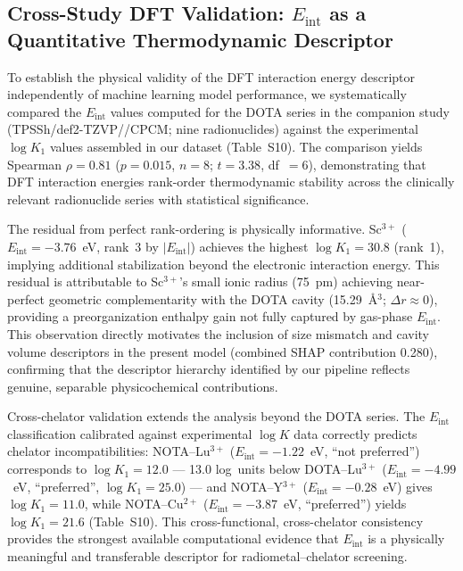 \documentclass[journal=jacsat,manuscript=article]{achemso}
\begin{document}
\subsection{Cross-Study DFT Validation: $E_\mathrm{int}$ as a Quantitative Thermodynamic Descriptor}
\label{sec:dft_val}

To establish the physical validity of the DFT interaction energy descriptor
independently of machine learning model performance, we systematically compared
the $E_\mathrm{int}$ values computed for the DOTA series in the companion
study\cite{Kim2026molpharm} (TPSSh/def2-TZVP//CPCM; nine radionuclides)
against the experimental $\log K_1$ values assembled in our dataset (Table~S10).
The comparison yields Spearman $\rho = 0.81$ ($p = 0.015$, $n = 8$;
$t = 3.38$, df~$= 6$), demonstrating that DFT interaction energies
rank-order thermodynamic stability across the clinically relevant radionuclide
series with statistical significance.

The residual from perfect rank-ordering is physically informative.
Sc$^{3+}$ ($E_\mathrm{int} = -3.76$~eV, rank~3 by $|E_\mathrm{int}|$)
achieves the highest $\log K_1 = 30.8$ (rank~1), implying additional
stabilization beyond the electronic interaction energy.
This residual is attributable to Sc$^{3+}$'s small ionic radius (75~pm)
achieving near-perfect geometric complementarity with the DOTA cavity
(15.29~\AA$^3$; $\Delta r \approx 0$), providing a preorganization enthalpy
gain not fully captured by gas-phase $E_\mathrm{int}$.\cite{Kim2026molpharm,Shannon1976}
This observation directly motivates the inclusion of size mismatch and cavity
volume descriptors in the present model (combined SHAP contribution 0.280),
confirming that the descriptor hierarchy identified by our pipeline reflects
genuine, separable physicochemical contributions.

Cross-chelator validation extends the analysis beyond the DOTA series.
The $E_\mathrm{int}$ classification\cite{Kim2026molpharm} calibrated against
experimental $\log K$ data correctly predicts chelator incompatibilities:
NOTA--Lu$^{3+}$ ($E_\mathrm{int} = -1.22$~eV, ``not preferred'') corresponds
to $\log K_1 = 12.0$ --- 13.0 log~units below DOTA--Lu$^{3+}$
($E_\mathrm{int} = -4.99$~eV, ``preferred'', $\log K_1 = 25.0$) ---
and NOTA--Y$^{3+}$ ($E_\mathrm{int} = -0.28$~eV) gives $\log K_1 = 11.0$,
while NOTA--Cu$^{2+}$ ($E_\mathrm{int} = -3.87$~eV, ``preferred'')
yields $\log K_1 = 21.6$ (Table~S10).
This cross-functional, cross-chelator consistency provides the strongest
available computational evidence that $E_\mathrm{int}$ is a physically
meaningful and transferable descriptor for radiometal--chelator screening.
\end{document}
